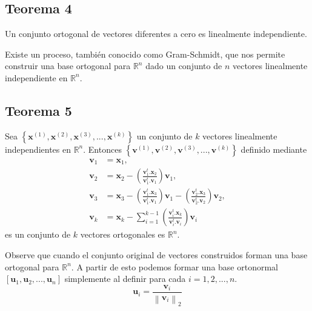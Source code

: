 \documentclass{report}
\numberwithin{subsection}{section} %
\begin{document}
\subsection{\textnormal{Teorema 4}}

Un conjunto ortogonal de vectores diferentes a cero es linealmente independiente.

Existe  un proceso, también conocido como Gram-Schmidt, que nos permite construir una base ortogonal para $\mathbb{R}^{n}$ dado un conjunto de $n$ vectores linealmente independiente en $\mathbb{R}^{n}$.

\subsection{\textnormal{Teorema 5}}

Sea $\left\{ \textbf{x}^{\left( 1 \right)}, \textbf{x}^{\left( 2 \right)}, \textbf{x}^{\left( 3 \right)}, ..., \textbf{x}^{\left( k \right)} \right\}$ un conjunto de $k$ vectores linealmente independientes en $\mathbb{R}^{n}$. Entonces $\left\{ \textbf{v}^{\left( 1 \right)}, \textbf{v}^{\left( 2 \right)}, \textbf{v}^{\left( 3 \right)}, ..., \textbf{v}^{\left( k \right)} \right\}$ definido mediante
\begin{align*}
\textbf{v}_{1} &= \textbf{x}_{1}, \\
\textbf{v}_{2} &= \textbf{x}_{2} - \left( \frac{ \textbf{v}_{1}^{t} .\textbf{x}_{2}}{ \textbf{v}_{1}^{t} .\textbf{v}_{1}} \right)\textbf{v}_{1}, \\
\textbf{v}_{3} &= \textbf{x}_{3} - \left( \frac{ \textbf{v}_{1}^{t} .\textbf{x}_{3}}{ \textbf{v}_{1}^{t} .\textbf{v}_{1}} \right)\textbf{v}_{1} - \left( \frac{ \textbf{v}_{2}^{t} .\textbf{x}_{3}}{ \textbf{v}_{2}^{t} .\textbf{v}_{2}} \right)\textbf{v}_{2}, \\
\textbf{v}_{k} &= \textbf{x}_{k} - \sum_{i=1}^{k-1} \left( \frac{ \textbf{v}_{i}^{t} .\textbf{x}_{k}}{ \textbf{v}_{i}^{t} .\textbf{v}_{i}} \right)\textbf{v}_{i}
\end{align*}
es un conjunto de $k$ vectores ortogonales es $\mathbb{R}^{n}$.

Observe que cuando el conjunto original de vectores construidos forman una base ortogonal para $\mathbb{R}^{n}$. A partir de esto podemos formar una base ortonormal $\left[ \textbf{u}_{1}, \textbf{u}_{2}, ... , \textbf{u}_{n} \right]$ simplemente al definir para cada $i = 1, 2, ..., n$.
\begin{equation}
\textbf{u}_{i} = \frac{ \textbf{v}_{i} }{\left\| \textbf{v}_{i} \right\|_{2}}
\end{equation}
\end{document}

